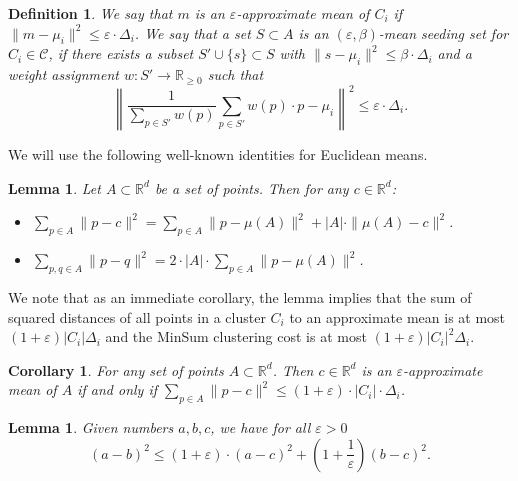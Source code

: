 \documentclass[10pt,a4paper]{amsart}
\newtheorem{corollary}[theorem]{Corollary}
\newtheorem{lemma}[theorem]{Lemma}
\newtheorem{definition}[theorem]{Definition}
\begin{document}
\begin{definition}
We say that $m$ is an $\varepsilon$-approximate mean of $C_i$ if $\|m-\mu_i\|^2 \leq \varepsilon\cdot \Delta_i$.
We say that a set $S\subset A$ is an $(\varepsilon,\beta)$-mean seeding set for $C_i\in \mathcal{C}$, if there exists a subset $S'\cup \{s\}\subset S$ 
with $\|s-\mu_i\|^2 \leq \beta\cdot \Delta_i$
and a weight assignment $w:S'\rightarrow \mathbb{R}_{\geq 0}$ such that 
$$
\left\|\frac{1}{\sum_{p\in S'}w(p)}\sum_{p\in S'} w(p)\cdot p - \mu_i\right\|^2 \leq \varepsilon\cdot \Delta_i.
$$
\end{definition}

We will use the following well-known identities for Euclidean means.
\begin{lemma}
\cite{InabaKI94}
\label{lem:magic}
    Let $A\subset \mathbb{R}^d$ be a set of points. Then for any $c\in \mathbb{R}^d$:
    \begin{itemize}
        \item $\sum_{p\in A} \|p-c\|^2 = \sum_{p\in A} \|p-\mu(A)\|^2 + |A|\cdot \|\mu(A)-c\|^2$.
        \item $\sum_{p,q\in A} \|p-q\|^2 = 2\cdot |A|\cdot \sum_{p\in A} \|p-\mu(A)\|^2$.
    \end{itemize}
\end{lemma}
We note that as an immediate corollary, the lemma implies that the sum of squared distances of all points in a cluster $C_i$ to an approximate mean is at most $(1+\varepsilon)|C_i|\Delta_i$ and the MinSum clustering cost is at most $(1+\varepsilon)|C_i|^2\Delta_i$.
\begin{corollary}
\label{cor:approxmean}
For any set of points $A\subset \mathbb{R}^d$. Then $c\in \mathbb{R}^d$ is an $\varepsilon$-approximate mean of $A$ if and only if $\sum_{p\in A} \|p-c\|^2 \leq (1+\varepsilon)\cdot |C_i|\cdot \Delta_i$.
\end{corollary}
\begin{lemma}
    \cite{BecchettiBC0S19}
    \label{lem:weaktriangle}
    Given numbers $a,b,c$, we have for all $\varepsilon>0$
    $$(a-b)^2 \leq (1+\varepsilon)\cdot (a-c)^2 + \left(1+\frac{1}{\varepsilon}\right)(b-c)^2.$$
\end{lemma}
\end{document}
